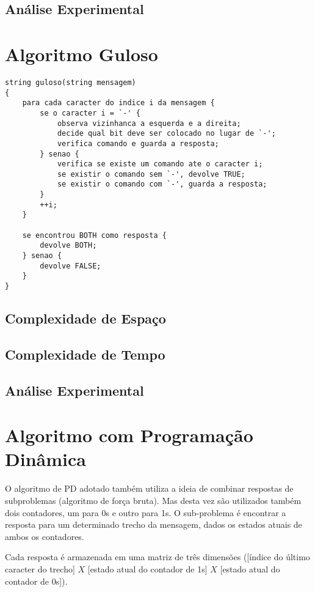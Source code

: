 \documentclass[a4paper,12pt,titlepage]{article}
\begin{document}
\subsection{Análise Experimental}

\section{Algoritmo Guloso}

\begin{lstlisting}[caption=Algoritmo Guloso]
string guloso(string mensagem)
{
    para cada caracter do indice i da mensagem {
        se o caracter i = `-' {
            observa vizinhanca a esquerda e a direita;
            decide qual bit deve ser colocado no lugar de `-';
            verifica comando e guarda a resposta;
        } senao {
            verifica se existe um comando ate o caracter i;
            se existir o comando sem `-', devolve TRUE;
            se existir o comando com `-', guarda a resposta;
        }
        ++i;
    }
    
    se encontrou BOTH como resposta {
        devolve BOTH;
    } senao {
        devolve FALSE;
    }
}
\end{lstlisting}

\subsection{Complexidade de Espaço}
\subsection{Complexidade de Tempo}
\subsection{Análise Experimental}

\section{Algoritmo com Programação Dinâmica}

O algoritmo de PD adotado também utiliza a ideia de combinar respostas de subproblemas (algoritmo de força bruta). Mas desta vez são utilizados também dois contadores, um para 0s e outro para 1s. O sub-problema é encontrar a resposta para um determinado trecho da mensagem, dados os estados atuais de ambos os contadores. 

Cada resposta é armazenada em uma matriz de três dimensões ([índice do último caracter do trecho] $X$ [estado atual do contador de 1s] $X$ [estado atual do contador de 0s]).
\end{document}
